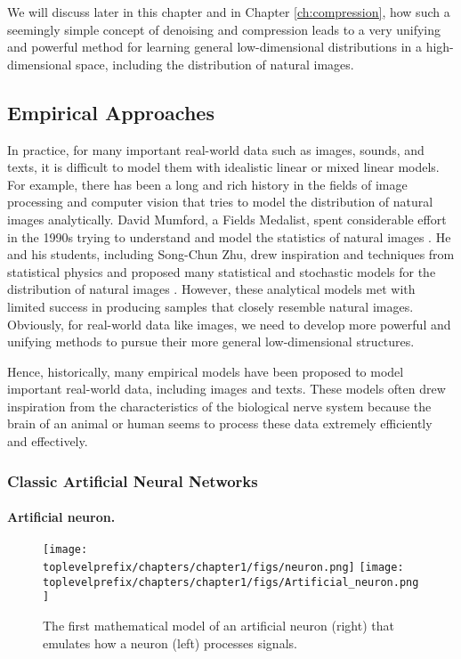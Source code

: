 \documentclass[\toplevelprefix/book-main.tex]{subfiles}
\begin{document}
We will discuss later in this chapter and in Chapter \ref{ch:compression}, how such a seemingly simple concept of denoising and compression leads to a very unifying and powerful method for learning general low-dimensional distributions in a high-dimensional space, including the distribution of natural images. 

\subsection{Empirical Approaches}
In practice, for many important real-world data such as images, sounds, and texts, it is difficult to model them with idealistic linear or mixed linear models. For example, there has been a long and rich history in the fields of image processing and computer vision that tries to model the distribution of natural images analytically. David Mumford, a Fields Medalist, spent considerable effort in the 1990s trying to understand and model the statistics of natural images \cite{Mumford1996TheSD}. He and his students, including Song-Chun Zhu, drew inspiration and techniques from statistical physics and proposed many statistical and stochastic models for the distribution of natural images \cite{Zhu-Entropy-1997,Zhu1997LearningGP,Zhu1997Prior,Huang-Mumford,Mumford-1999,Lee-Mumford}. However, these analytical models met with limited success in producing samples that closely resemble natural images. Obviously, for real-world data like images, we need to develop more powerful and unifying methods to pursue their more general low-dimensional structures.

Hence, historically, many empirical models  have been proposed to model important real-world data, including images and texts. These models often drew inspiration from the characteristics of the biological nerve system because the brain of an animal or human seems to process these data extremely efficiently and effectively. 

\subsubsection{Classic Artificial Neural Networks}
\paragraph{Artificial neuron.}

\begin{figure}[t]
    \centering
\texttt{[image: \\toplevelprefix/chapters/chapter1/figs/neuron.png]} \hspace{3mm}   
\texttt{[image: \\toplevelprefix/chapters/chapter1/figs/Artificial\_neuron.png]}
    \caption{The first mathematical model of an artificial neuron (right) that emulates how a neuron (left) processes signals. }
    \label{fig:neuron}
\end{figure}
\end{document}
